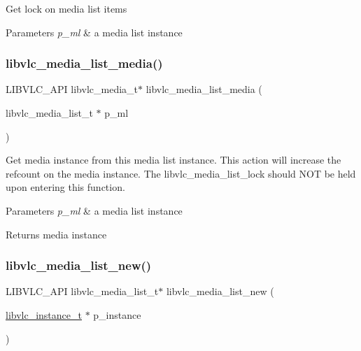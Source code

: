 Get lock on media list items


\begin{DoxyParams}{Parameters}
{\em p\+\_\+ml} & a media list instance \\
\hline
\end{DoxyParams}
\mbox{\label{group__libvlc__media__list_ga39f047f672f608104a599e827c2e7533}} 
\subsubsection{\texorpdfstring{libvlc\+\_\+media\+\_\+list\+\_\+media()}{libvlc\_media\_list\_media()}}
{\footnotesize\ttfamily L\+I\+B\+V\+L\+C\+\_\+\+A\+PI libvlc\+\_\+media\+\_\+t$\ast$ libvlc\+\_\+media\+\_\+list\+\_\+media (\begin{DoxyParamCaption}\item[{libvlc\+\_\+media\+\_\+list\+\_\+t $\ast$}]{p\+\_\+ml }\end{DoxyParamCaption})}

Get media instance from this media list instance. This action will increase the refcount on the media instance. The libvlc\+\_\+media\+\_\+list\+\_\+lock should N\+OT be held upon entering this function.


\begin{DoxyParams}{Parameters}
{\em p\+\_\+ml} & a media list instance \\
\hline
\end{DoxyParams}
\begin{DoxyReturn}{Returns}
media instance 
\end{DoxyReturn}
\mbox{\label{group__libvlc__media__list_ga441500e86c4b21cb32afbc96a0733f57}} 
\subsubsection{\texorpdfstring{libvlc\+\_\+media\+\_\+list\+\_\+new()}{libvlc\_media\_list\_new()}}
{\footnotesize\ttfamily L\+I\+B\+V\+L\+C\+\_\+\+A\+PI libvlc\+\_\+media\+\_\+list\+\_\+t$\ast$ libvlc\+\_\+media\+\_\+list\+\_\+new (\begin{DoxyParamCaption}\item[{\hyperlink{group__libvlc__core_ga316d739a80da4678206c79f4d6c2e284}{libvlc\+\_\+instance\+\_\+t} $\ast$}]{p\+\_\+instance }\end{DoxyParamCaption})}

